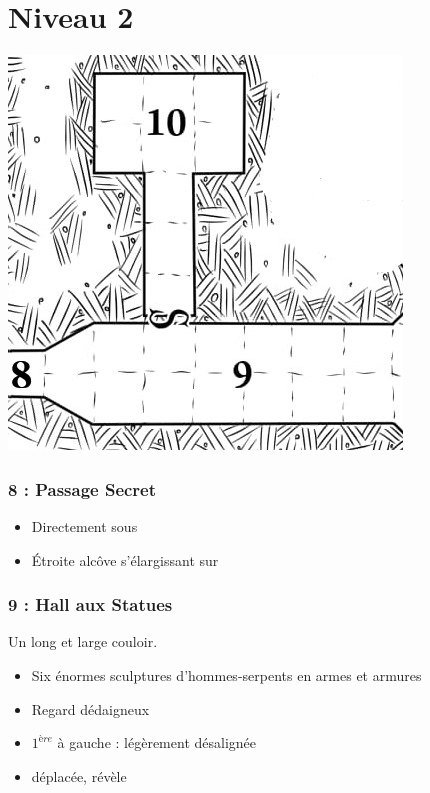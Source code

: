 \chapter{Niveau 2}\label{n2}

\includegraphics[width=\columnwidth]{pics/map_8-10.jpg}
\subsection{8 : Passage Secret}\label{n2:s8}
\begin{itemize}
  \item Directement sous \textbf{}
  \item \'Etroite alcôve s’élargissant sur \textbf{}
\end{itemize}

\subsection{9 : Hall aux Statues}\label{n2:s9}
Un long et large couloir. 
\begin{itemize}
  \item Six énormes sculptures d’hommes-serpents en armes et armures
  \item Regard dédaigneux
  \item $1^{ère}$ à gauche : légèrement désalignée
  \item  déplacée, révèle \textbf{}
\end{itemize}

